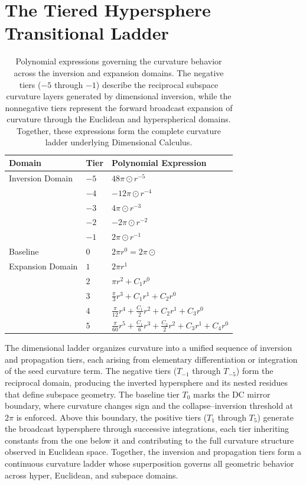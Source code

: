 \documentclass[final,onefignum,onetabnum]{siamart}
\begin{document}
\section{The Tiered Hypersphere Transitional Ladder}

\begin{table}[htbp]
\centering
\caption{Polynomial expressions governing the curvature behavior across the inversion and expansion domains. The negative tiers ($-5$ through $-1$) describe the reciprocal subspace curvature layers generated by dimensional inversion, while the nonnegative tiers represent the forward broadcast expansion of curvature through the Euclidean and hyperspherical domains. Together, these expressions form the complete curvature ladder underlying Dimensional Calculus.}

\label{tab:curvature-ladder}
\begin{tabular}{lll}
\hline
\textbf{Domain} & \textbf{Tier} & \textbf{Polynomial Expression} \\
\hline
Inversion Domain & $-5$ & $48\pi \odot r^{-5}$ \\
                 & $-4$ & $-12\pi \odot r^{-4}$ \\
                 & $-3$ & $4\pi \odot r^{-3}$ \\
                 & $-2$ & $-2\pi \odot r^{-2}$ \\
                 & $-1$ & $2\pi \odot r^{-1}$ \\
Baseline         & $0$  & $2\pi r^{0} = 2\pi \odot$ \\
Expansion Domain & $1$  & $2\pi r^{1}$ \\
                 & $2$  & $\pi r^{2} + C_{1} r^{0}$ \\
                 & $3$  & $\frac{\pi}{3} r^{3} + C_{1} r^{1} + C_{2} r^{0}$ \\
                 & $4$  & $\frac{\pi}{12} r^{4} + \frac{C_{1}}{2} r^{2} + C_{2} r^{1} + C_{3} r^{0}$ \\
                 & $5$  & $\frac{\pi}{60} r^{5} + \frac{C_{1}}{6} r^{3} + \frac{C_{2}}{2} r^{2} + C_{3} r^{1} + C_{4} r^{0}$ \\
\hline
\end{tabular}
\end{table}

The dimensional ladder organizes curvature into a unified sequence of inversion and propagation tiers, each arising from elementary differentiation or integration of the seed curvature term. The negative tiers ($T_{-1}$ through $T_{-5}$) form the reciprocal domain, producing the inverted hypersphere and its nested residues that define subspace geometry. The baseline tier $T_{0}$ marks the DC mirror boundary, where curvature changes sign and the collapse--inversion threshold at $2\pi$ is enforced. Above this boundary, the positive tiers ($T_{1}$ through $T_{5}$) generate the broadcast hypersphere through successive integrations, each tier inheriting constants from the one below it and contributing to the full curvature structure observed in Euclidean space. Together, the inversion and propagation tiers form a continuous curvature ladder whose superposition governs all geometric behavior across hyper, Euclidean, and subspace domains.
\end{document}
